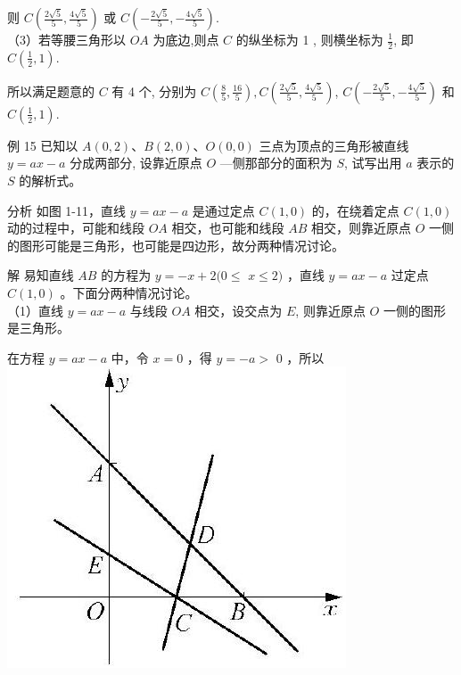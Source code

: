 \documentclass[10pt]{article}
\begin{document}
则 $C\left(\frac{2 \sqrt{5}}{5}, \frac{4 \sqrt{5}}{5}\right)$ 或 $C\left(-\frac{2 \sqrt{5}}{5},-\frac{4 \sqrt{5}}{5}\right)$.\\
（3）若等腰三角形以 $O A$ 为底边,则点 $C$ 的纵坐标为 1 , 则横坐标为 $\frac{1}{2}$, 即 $C\left(\frac{1}{2}, 1\right)$.

所以满足题意的 $C$ 有 4 个, 分别为 $C\left(\frac{8}{5}, \frac{16}{5}\right), C\left(\frac{2 \sqrt{5}}{5}, \frac{4 \sqrt{5}}{5}\right)$, $C\left(-\frac{2 \sqrt{5}}{5},-\frac{4 \sqrt{5}}{5}\right)$ 和 $C\left(\frac{1}{2}, 1\right)$.

例 15 已知以 $A(0,2) 、 B(2,0) 、 O(0,0)$ 三点为顶点的三角形被直线 $y=a x-a$ 分成两部分, 设靠近原点 $O$ —侧那部分的面积为 $S$, 试写出用 $a$ 表示的 $S$ 的解析式。

分析 如图 1-11，直线 $y=a x-a$ 是通过定点 $C(1,0)$ 的，在绕着定点 $C(1,0)$ 动的过程中，可能和线段 $O A$ 相交，也可能和线段 $A B$ 相交，则靠近原点 $O$ 一侧的图形可能是三角形，也可能是四边形，故分两种情况讨论。

解 易知直线 $A B$ 的方程为 $y=-x+2(0 \leqslant$ $x \leqslant 2)$ ，直线 $y=a x-a$ 过定点 $C(1,0)$ 。下面分两种情况讨论。\\
（1）直线 $y=a x-a$ 与线段 $O A$ 相交，设交点为 $E$, 则靠近原点 $O$ 一侧的图形是三角形。

在方程 $y=a x-a$ 中，令 $x=0$ ，得 $y=-a>$ 0 ，所以\\
\includegraphics[max width=\textwidth, center]{2024_10_30_1bf34f7aeb61f11d11d3g-021}
\end{document}
